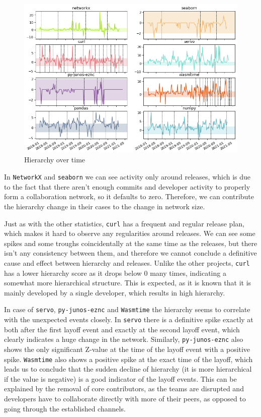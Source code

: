 \begin{figure}
    \centering
    \includegraphics[width=\textwidth]{figures/qualitative/hierarchy/hierarchy_all_z.png}
    \caption{Hierarchy over time}
    \label{fig:hierarchy_all}
\end{figure}

In \texttt{NetworkX} and \texttt{seaborn} we can see activity only around releases, which is due to the fact that there aren't enough commits and developer activity to properly form a collaboration network, so it defaults to zero. Therefore, we can contribute the hierarchy change in their cases to the change in network size.

Just as with the other statistics, \texttt{curl} has a frequent and regular release plan, which makes it hard to observe any regularities around releases. We can see some spikes and some troughs coincidentally at the same time as the releases, but there isn't any consistency between them, and therefore we cannot conclude a definitive cause and effect between hierarchy and releases. Unlike the other projects, \texttt{curl} has a lower hierarchy score as it drops below $0$ many times, indicating a somewhat more hierarchical structure. This is expected, as it is known that it is mainly developed by a single developer, which results in high hierarchy.

In case of \texttt{servo}, \texttt{py-junos-eznc} and \texttt{Wasmtime} the hierarchy seems to correlate with the unexpected events closely. In \texttt{servo} there is a definitive spike exactly at both after the first layoff event and exactly at the second layoff event, which clearly indicates a huge change in the network. Similarly, \texttt{py-junos-eznc} also shows the only significant Z-value at the time of the layoff event with a positive spike. \texttt{Wasmtime} also shows a positive spike at the exact time of the layoff, which leads us to conclude that the sudden decline of hierarchy (it is more hierarchical if the value is negative) is a good indicator of the layoff events. This can be explained by the removal of core contributors, as the teams are disrupted and developers have to collaborate directly with more of their peers, as opposed to going through the established channels.

